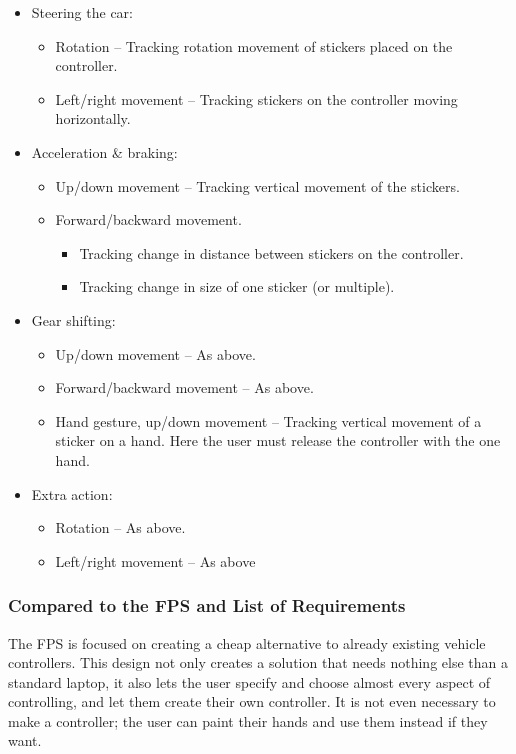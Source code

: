 \begin{itemize}
	\item Steering the car:
	\begin{itemize}
		\item Rotation – Tracking rotation movement of stickers placed on the controller.
		\item Left/right movement – Tracking stickers on the controller moving horizontally.
	\end{itemize}
	
	\item Acceleration \& braking:
	\begin{itemize}
		\item Up/down movement – Tracking vertical movement of the stickers.
		\item Forward/backward movement.
		\begin{itemize}
			\item Tracking change in distance between stickers on the controller.
			\item Tracking change in size of one sticker (or multiple).
		\end{itemize}
	\end{itemize}
	
	\item Gear shifting:
	\begin{itemize}
		\item Up/down movement – As above.
		\item Forward/backward movement – As above.
		\item Hand gesture, up/down movement – Tracking vertical movement of a sticker on a hand. Here the user must release the controller with the one hand.
	\end{itemize}
	
	\item Extra action:
	\begin{itemize}
		\item Rotation – As above.
		\item Left/right movement – As above
	\end{itemize}
\end{itemize}
\bigskip

\subsubsection*{Compared to the FPS and List of Requirements}
The FPS is focused on creating a cheap alternative to already existing vehicle controllers. This design not only creates a solution that needs nothing else than a standard laptop, it also lets the user specify and choose almost every aspect of controlling, and let them create their own controller. It is not even necessary to make a controller; the user can paint their hands and use them instead if they want.

